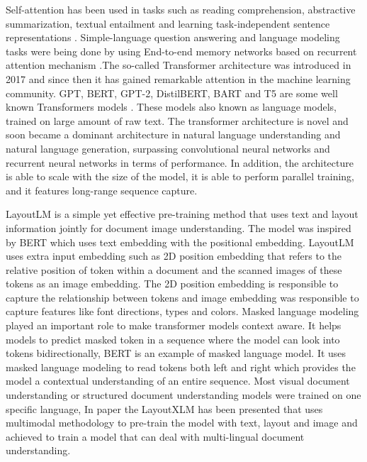 Self-attention has been used in tasks such as reading comprehension, abstractive summarization, textual entailment and learning task-independent sentence representations \cite{cheng2016longshorttermmemory, parikh2016decomposable, paulus2017deep, lin2017structured}. Simple-language question answering and language modeling tasks were being done by using End-to-end memory networks based on recurrent attention mechanism \cite{sukhbaatar2015end}.The so-called Transformer architecture was introduced in 2017 \cite{vaswani2017attention} and since then it has gained remarkable attention in the machine learning community. GPT, BERT, GPT-2, DistilBERT, BART and T5 are some well known Transformers models \cite{radford2018improving, devlin2018bert, GPT_2, DistilBERT, T5}. These models also known as language models, trained on large amount of raw text. The transformer architecture is novel and soon became a dominant architecture in natural language understanding and natural language generation, surpassing convolutional neural networks and recurrent neural networks in terms of performance. In addition, the architecture is able to scale with the size of the model, it is able to perform parallel training, and it features long-range sequence capture.


LayoutLM \cite{xu2020layoutlm} is a simple yet effective pre-training method that uses text and layout information jointly for document image understanding.  The model was inspired by BERT \cite{devlin2018bert} which uses text embedding with the positional embedding. LayoutLM uses extra input embedding such as 2D position embedding that refers to the relative position of token within a document and the scanned images of these tokens as an image embedding. The 2D position embedding is responsible to capture the relationship between tokens and image embedding was responsible to capture features like font directions, types and colors. Masked language modeling played an important role to make transformer models context aware. It helps models to predict masked token in a sequence where the model can look into tokens bidirectionally, BERT is an example of masked language model. It uses masked language modeling to read tokens both left and right which provides the model a contextual understanding of an entire sequence. Most visual document understanding or structured document understanding models were trained on one specific language, In paper \cite{xu2021layoutxlm} the LayoutXLM has been presented that uses multimodal methodology to pre-train the model with text, layout and image and achieved to train a model that can  deal with multi-lingual document understanding.   


